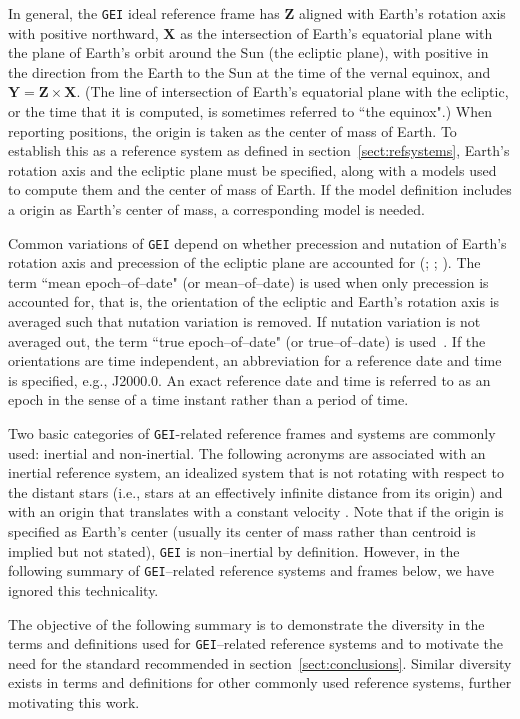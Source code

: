 \documentclass[draft]{agujournal2019}
\begin{document}
In general, the \texttt{GEI} ideal reference frame has $\mathbf{Z}$ aligned with Earth's rotation axis with positive northward, $\mathbf{X}$ as the intersection of Earth's equatorial plane with the plane of Earth's orbit around the Sun (the ecliptic plane), with positive in the direction from the Earth to the Sun at the time of the vernal equinox, and $\mathbf{Y}=\mathbf{Z}\times\mathbf{X}$. (The line of intersection of Earth's equatorial plane with the ecliptic, or the time that it is computed, is sometimes referred to ``the equinox".) When reporting positions, the origin is taken as the center of mass of Earth. To establish this as a reference system as defined in section~\ref{sect:refsystems}, Earth's rotation axis and the ecliptic plane must be specified, along with a models used to compute them and the center of mass of Earth. If the model definition includes a origin as Earth's center of mass, a corresponding model is needed.

Common variations of \texttt{GEI} depend on whether precession and nutation of Earth's rotation axis and precession of the ecliptic plane are accounted for (; ; ). The term ``mean epoch--of--date" (or mean--of--date) is used when only precession is accounted for, that is, the orientation of the ecliptic and Earth's rotation axis is averaged such that nutation variation is removed. If nutation variation is not averaged out, the term ``true epoch--of--date" (or true--of--date) is used~\cite{Hapgood1995}. If the orientations are time independent, an abbreviation for a reference date and time is specified, e.g., J2000.0. An exact reference date and time is referred to as an epoch in the sense of a time instant rather than a period of time.

Two basic categories of \texttt{GEI}-related reference frames and systems are commonly used: inertial and non-inertial. The following acronyms are associated with an inertial reference system, an idealized system that is not rotating with respect to the distant stars (i.e., stars at an effectively infinite distance from its origin) and with an origin that translates with a constant velocity \cite{NAIFOverview2023}. Note that if the origin is specified as Earth's center (usually its center of mass rather than centroid is implied but not stated), \texttt{GEI} is non--inertial by definition. However, in the following summary of \texttt{GEI}--related reference systems and frames below, we have ignored this technicality.

The objective of the following summary is to demonstrate the diversity in the terms and definitions used for \texttt{GEI}--related reference systems and to motivate the need for the standard recommended in section~\ref{sect:conclusions}. Similar diversity exists in terms and definitions for other commonly used reference systems, further motivating this work.
\end{document}
